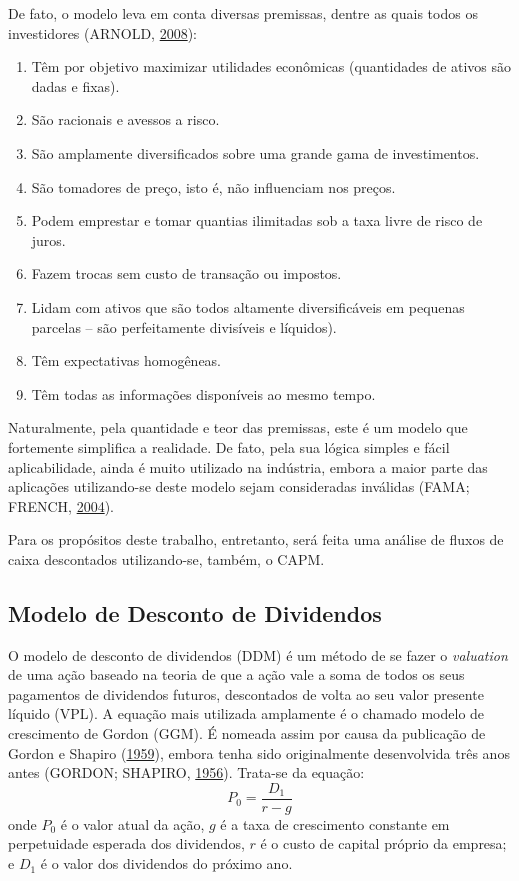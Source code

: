 \documentclass[grad,numbers]{coppe}
\providecommand{\tightlist}{%
  \setlength{\itemsep}{0pt}\setlength{\parskip}{0pt}}
\begin{document}
  De fato, o modelo leva em conta diversas premissas, dentre as quais todos os investidores (ARNOLD, \protect\hyperlink{ref-arnold2008}{2008}):
  \begin{enumerate}
  \def\labelenumi{\arabic{enumi}.}
  \tightlist
  \item
    Têm por objetivo maximizar utilidades econômicas (quantidades de ativos são dadas e fixas).
  \item
    São racionais e avessos a risco.
  \item
    São amplamente diversificados sobre uma grande gama de investimentos.
  \item
    São tomadores de preço, isto é, não influenciam nos preços.
  \item
    Podem emprestar e tomar quantias ilimitadas sob a taxa livre de risco de juros.
  \item
    Fazem trocas sem custo de transação ou impostos.
  \item
    Lidam com ativos que são todos altamente diversificáveis em pequenas parcelas -- são perfeitamente divisíveis e líquidos).
  \item
    Têm expectativas homogêneas.
  \item
    Têm todas as informações disponíveis ao mesmo tempo.
  \end{enumerate}
  Naturalmente, pela quantidade e teor das premissas, este é um modelo que fortemente simplifica a realidade. De fato, pela sua lógica simples e fácil aplicabilidade, ainda é muito utilizado na indústria, embora a maior parte das aplicações utilizando-se deste modelo sejam consideradas inválidas (FAMA; FRENCH, \protect\hyperlink{ref-fama2004}{2004}).

  Para os propósitos deste trabalho, entretanto, será feita uma análise de fluxos de caixa descontados utilizando-se, também, o CAPM.

  \hypertarget{modelo-de-desconto-de-dividendos}{%
  \subsection{Modelo de Desconto de Dividendos}\label{modelo-de-desconto-de-dividendos}}

  O modelo de desconto de dividendos (DDM) é um método de se fazer o \emph{valuation} de uma ação baseado na teoria de que a ação vale a soma de todos os seus pagamentos de dividendos futuros, descontados de volta ao seu valor presente líquido (VPL). A equação mais utilizada amplamente é o chamado modelo de crescimento de Gordon (GGM). É nomeada assim por causa da publicação de Gordon e Shapiro (\protect\hyperlink{ref-gordon1959}{1959}), embora tenha sido originalmente desenvolvida três anos antes (GORDON; SHAPIRO, \protect\hyperlink{ref-gordon1956}{1956}). Trata-se da equação: \[
  P_0 = \frac{D_1}{r-g}
  \] onde \(P_0\) é o valor atual da ação, \(g\) é a taxa de crescimento constante em perpetuidade esperada dos dividendos, \(r\) é o custo de capital próprio da empresa; e \(D_1\) é o valor dos dividendos do próximo ano.
\end{document}
